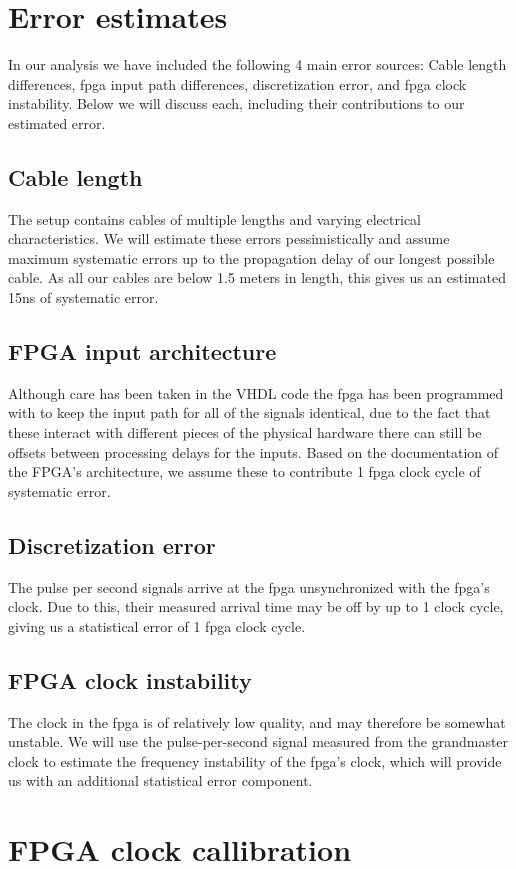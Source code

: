 \documentclass{article}
\begin{document}
\section{Error estimates}

In our analysis we have included the following 4 main error sources: Cable length differences, fpga input path differences, discretization error, and fpga clock instability. Below we will discuss each, including their contributions to our estimated error.
\subsection{Cable length}
The setup contains cables of multiple lengths and varying electrical characteristics. We will estimate these errors pessimistically and assume maximum systematic errors up to the propagation delay of our longest possible cable. As all our cables are below 1.5 meters in length, this gives us an estimated 15ns of systematic error.
\subsection{FPGA input architecture}
Although care has been taken in the VHDL code the fpga has been programmed with to keep the input path for all of the signals identical, due to the fact that these interact with different pieces of the physical hardware there can still be offsets between processing delays for the inputs. Based on the documentation of the FPGA's architecture, we assume these to contribute 1 fpga clock cycle of systematic error.
\subsection{Discretization error}
The pulse per second signals arrive at the fpga unsynchronized with the fpga's clock. Due to this, their measured arrival time may be off by up to 1 clock cycle, giving us a statistical error of 1 fpga clock cycle.
\subsection{FPGA clock instability}
The clock in the fpga is of relatively low quality, and may therefore be somewhat unstable. We will use the pulse-per-second signal measured from the grandmaster clock to estimate the frequency instability of the fpga's clock, which will provide us with an additional statistical error component.

\section{FPGA clock callibration}
\end{document}
